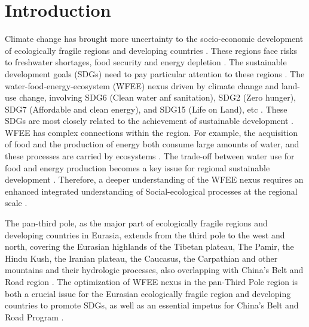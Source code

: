 \documentclass[Afour,sageh,times]{sagej}
\begin{document}
\section{Introduction}
Climate change has brought more uncertainty to the socio-economic development of ecologically fragile regions and developing countries \citep{rasulNexusApproachWater2016,pritchardAsiaShrinkingGlaciers2019b}. These regions face risks to freshwater shortages, food security and energy depletion \citep{bazilianConsideringEnergyWater2011, gainMeasuringGlobalWater2016, viviroliIncreasingDependenceLowland2020}. The sustainable development goals (SDGs) need to pay particular attention to these regions \citep{pradhanSystematicStudySustainable2017}. The water-food-energy-ecosystem (WFEE) nexus driven by climate change and land-use change, involving SDG6 (Clean water anf sanitation), SDG2 (Zero hunger), SDG7 (Affordable and clean energy), and SDG15 (Life on Land), etc \citep{fuPromotingGeographySustainability2020, pengLinkingSpatialDifferentiation2020}. These SDGs are most closely related to the achievement of sustainable development \citep{schroederRelevanceCircularEconomy2019}. WFEE has complex connections within the region. For example, the acquisition of food and the production of energy both consume large amounts of water, and these processes are carried by ecosystems \citep{fuUnravellingComplexityAchieving2019}. The trade-off between water use for food and energy production becomes a key issue for regional sustainable development \citep{liuNexusApproachesGlobal2018}. Therefore, a deeper understanding of the WFEE nexus requires an enhanced integrated understanding of Social-ecological processes at the regional scale \citep{mcelweeImpactInterventionsGlobal2020}.

The pan-third pole, as the major part of ecologically fragile regions and developing countries in Eurasia, extends from the third pole to the west and north, covering the Eurasian highlands of the Tibetan plateau, The Pamir, the Hindu Kush, the Iranian plateau, the Caucasus, the Carpathian and other mountains and their hydrologic processes, also overlapping with China's Belt and Road region \citep{yaoCongQingCangGaoYuanDaoDiSanJiHeFanDiSanJi2017}. The optimization of WFEE nexus in the pan-Third Pole region is both a crucial issue for the Eurasian ecologically fragile region and developing countries to promote SDGs, as well as an essential impetus for China's Belt and Road Program \citep{yaoFanDiSanJiHuanJingBianHuaYuDuiCe2018}.
\end{document}
